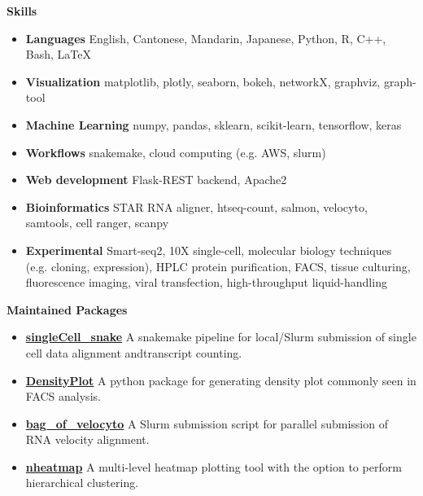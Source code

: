 \documentclass[letterpaper,12pt]{article}[leftmargin=*]
\def \entryspacing {-0pt}
\renewcommand{\section}[2]{\vspace{5pt}
  \colorbox{secondary}{\color{white}\raggedbottom\normalsize\textbf{{#1}{\hspace{7pt}#2}}}
}
\newcommand{\resumeEntryStart}{\begin{itemize}[leftmargin=2.5mm]}
\newcommand{\resumeEntryEnd}{\end{itemize}\vspace{\entryspacing}}
\newcommand{\resumeEntryS}[2]{
  \item[]\small{
    \textbf{\color{primary}#1 }{ #2 \vspace{-6pt}}
  }
}
\begin{document}
\section{\faBarChart}{Skills}
 \resumeEntryStart
  \resumeEntryS{Languages } {English, Cantonese, Mandarin, Japanese, Python, R, C++, Bash, \LaTeX}
  \resumeEntryS{Visualization } {matplotlib, plotly, seaborn, bokeh, networkX, graphviz, graph-tool}
  \resumeEntryS{Machine Learning } {numpy, pandas, sklearn, scikit-learn, tensorflow, keras}
  \resumeEntryS{Workflows } {snakemake, cloud computing (e.g. AWS, slurm)}
  \resumeEntryS{Web development } {Flask-REST backend, Apache2}
  \resumeEntryS{Bioinformatics } {STAR RNA aligner, htseq-count, salmon, velocyto, samtools, cell ranger, scanpy}
  \resumeEntryS{Experimental } {Smart-seq2, 10X single-cell, molecular biology techniques (e.g. cloning, expression), HPLC protein purification, FACS, tissue culturing, fluorescence imaging, viral transfection, high-throughput liquid-handling}
 \resumeEntryEnd

\section{\faGithub}{Maintained Packages}
 \resumeEntryStart
  \resumeEntryS{\href{https://github.com/xuesoso/singleCell\_snake}{singleCell\_snake} } {A snakemake pipeline for local/Slurm submission of single cell data alignment andtranscript counting.}
  \resumeEntryS{\href{https://github.com/xuesoso/DensityPlot}{DensityPlot} } {A python package for generating density plot commonly seen in FACS analysis.}
  \resumeEntryS{\href{https://github.com/xuesoso/bag\_of\_velocyto}{bag\_of\_velocyto} } {A Slurm submission script for parallel submission of RNA velocity alignment.}
  \resumeEntryS{\href{https://github.com/xuesoso/nheatmap}{nheatmap} } {A multi-level heatmap plotting tool with the option to perform hierarchical clustering.}
 \resumeEntryEnd
\end{document}
